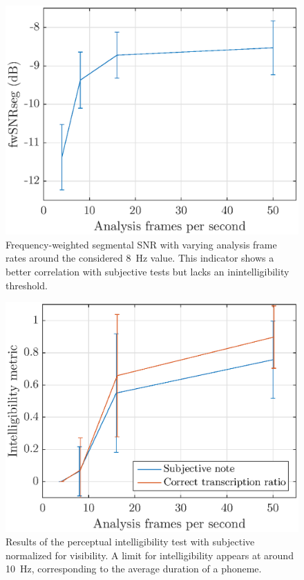 \documentclass[final,3p,times,twocolumn]{elsarticle}
\begin{document}
\begin{figure}[htbp]
	\centering
		\includegraphics[width=\columnwidth]{figures/fwsnrseg_tob_fps.eps}
	\caption{Frequency-weighted segmental SNR with varying analysis frame rates around the considered 8~Hz value. This indicator shows a better correlation with subjective tests but lacks an inintelligibility threshold.}
	\label{fig:fwsnrseg_tob_fps}
\end{figure}

\begin{figure}[htbp]
	\centering
		\includegraphics[width=\columnwidth]{figures/subj_int.eps}
	\caption{Results of the perceptual intelligibility test with subjective normalized for visibility. A limit for intelligibility appears at around 10~Hz, corresponding to the average duration of a phoneme.}
	\label{fig:subj_int}
\end{figure}
\end{document}
